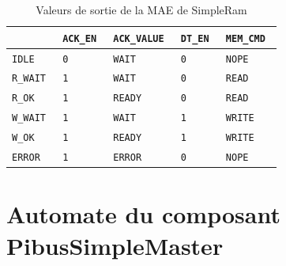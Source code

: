 \documentclass{article}
\begin{document}
\begin{table}[!htb]
\begin{minipage}{.5\linewidth}
\end{minipage}%
\begin{minipage}{.5\linewidth}
\centering
\caption{Valeurs de sortie de la MAE de SimpleRam}
\begin{tabular}{| l | l | l | l | l |}
\hline
                    & \tt{ACK\_EN}      & \tt{ACK\_VALUE}   & \tt{DT\_EN} & \tt{MEM\_CMD}   \\
\hline
\tt{IDLE}           & \tt{0}            & \tt{WAIT}         & \tt{0}      & \tt{NOPE}         \\
\tt{R\_WAIT}        & \tt{1}            & \tt{WAIT}         & \tt{0}      & \tt{READ}         \\
\tt{R\_OK}          & \tt{1}            & \tt{READY}        & \tt{0}      & \tt{READ}         \\
\tt{W\_WAIT}        & \tt{1}            & \tt{WAIT}         & \tt{1}      & \tt{WRITE}        \\
\tt{W\_OK}          & \tt{1}            & \tt{READY}        & \tt{1}      & \tt{WRITE}        \\
\tt{ERROR}          & \tt{1}            & \tt{ERROR}        & \tt{0}      & \tt{NOPE}         \\
\hline
\end{tabular}
\end{minipage}
\endgroup
\end{table}







\section{Automate du composant PibusSimpleMaster}
\end{document}
